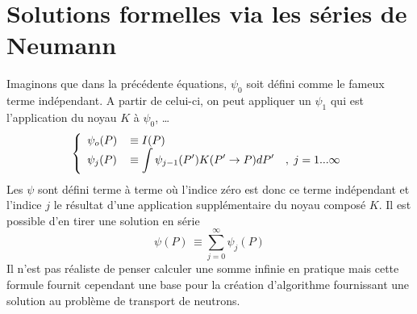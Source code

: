 \section{Solutions formelles via les séries de Neumann}
Imaginons que dans la précédente équations, $\psi_0$ soit défini comme le fameux terme indépendant. 
A partir de celui-ci, on peut appliquer un $\psi_1$ qui est l'application du noyau $K$ à $\psi_0$, 
\dots 
\begin{equation}
\left\{\begin{array}{ll}
{\psi _o}(P) &\equiv I(P)\\
{\psi _j}(P)\, &\displaystyle\equiv \int   {\psi _{j - 1}}(P')K(P' \to P)dP'\quad ,\;j = 1...\infty 
\end{array}\right.
\end{equation}
Les $\psi$ sont défini terme à terme où l'indice zéro est donc ce terme indépendant et l'indice 
$j$ le résultat d'une application supplémentaire du noyau composé $K$. Il est possible d'en tirer 
une solution en série
\begin{equation}
\psi (P)\, \equiv \sum\limits_{j = 0}^\infty    {\psi _j}(P)
\end{equation}
Il n'est pas réaliste de penser calculer une somme infinie en pratique mais cette
formule fournit cependant une base pour la création d'algorithme fournissant une
solution au problème de transport de neutrons.